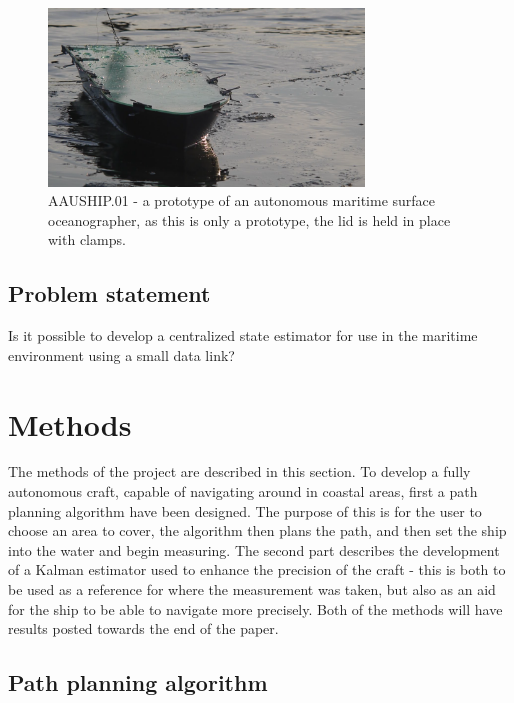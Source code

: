 \documentclass{ifacconf}
\begin{document}
\begin{figure}
	\begin{center}
		\includegraphics[width=8.4cm]{img/aauship.png} %
		\caption{AAUSHIP.01 - a prototype of an autonomous maritime surface oceanographer, as this is only a prototype, the lid is held in place with clamps. }  
		\label{fig:ship}
	\end{center}
\end{figure}

\subsection{Problem statement}
Is it possible to develop a centralized state estimator for use in the maritime environment using a small data link?

\section{Methods}

The methods of the project are described in this section. To develop a fully autonomous craft, capable of navigating around in coastal areas, first a path planning algorithm have been designed. The purpose of this is for the user to choose an area to cover, the algorithm then plans the path, and then set the ship into the water and begin measuring. The second part describes the development of a Kalman estimator used to enhance the precision of the craft - this is both to be used as a reference for where the measurement was taken, but also as an aid for the ship to be able to navigate more precisely. Both of the methods will have results posted towards the end of the paper. 

\subsection{Path planning algorithm}
\end{document}
